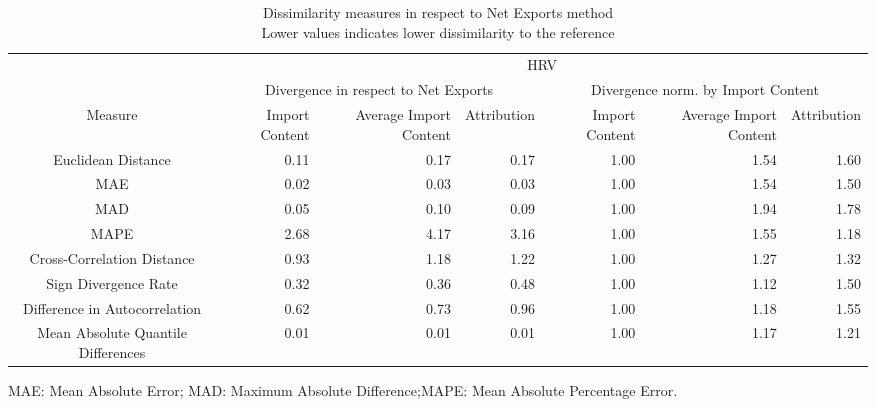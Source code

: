 \begin{table}[t]
\caption*{
{\large Dissimilarity measures in respect to Net Exports method} \\ 
{\small Lower values indicates lower dissimilarity to the reference}
} 
\fontsize{15.0pt}{18.0pt}\selectfont
\begin{tabular*}{\linewidth}{@{\extracolsep{\fill}}crrrrrr}
\toprule
 & \multicolumn{6}{c}{HRV} \\ 
\cmidrule(lr){2-7}
 & \multicolumn{3}{c}{Divergence in respect to Net Exports} & \multicolumn{3}{c}{Divergence norm. by Import Content} \\ 
\cmidrule(lr){2-4} \cmidrule(lr){5-7}
Measure & Import Content & Average Import Content & Attribution & Import Content & Average Import Content & Attribution \\ 
\midrule\addlinespace[2.5pt]
Euclidean Distance & 0.11 & 0.17 & 0.17 & 1.00 & 1.54 & 1.60 \\ 
MAE & 0.02 & 0.03 & 0.03 & 1.00 & 1.54 & 1.50 \\ 
MAD & 0.05 & 0.10 & 0.09 & 1.00 & 1.94 & 1.78 \\ 
MAPE & 2.68 & 4.17 & 3.16 & 1.00 & 1.55 & 1.18 \\ 
Cross-Correlation Distance & 0.93 & 1.18 & 1.22 & 1.00 & 1.27 & 1.32 \\ 
Sign Divergence Rate & 0.32 & 0.36 & 0.48 & 1.00 & 1.12 & 1.50 \\ 
Difference in Autocorrelation & 0.62 & 0.73 & 0.96 & 1.00 & 1.18 & 1.55 \\ 
Mean Absolute Quantile Differences & 0.01 & 0.01 & 0.01 & 1.00 & 1.17 & 1.21 \\ 
\bottomrule
\end{tabular*}
\begin{minipage}{\linewidth}
MAE: Mean Absolute Error; MAD: Maximum Absolute Difference;MAPE: Mean Absolute Percentage Error.\\
\end{minipage}
\end{table}

